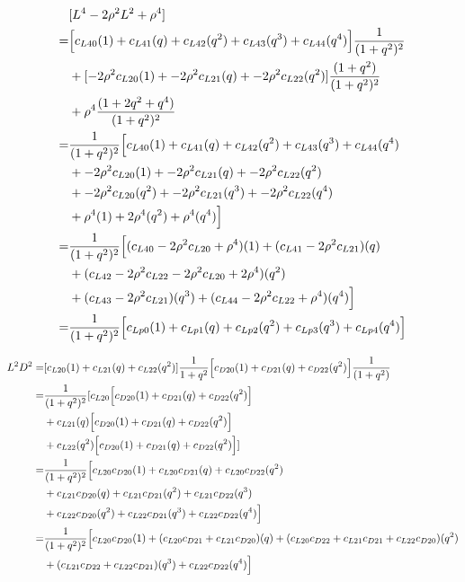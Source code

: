 \documentclass[12pt]{article}
\begin{document}
\begin{align}
    &[ L^4 -2\rho^2L^2 + \rho^4 ] \nonumber\\
    =& \Bigl[ c_{L40}(1) +  c_{L41}(q) + c_{L42}(q^2) + c_{L43}(q^3) + c_{L44}(q^4) \Bigr]\frac{1}{(1+q^2)^2} \nonumber\\
    &+ [ -2\rho^2c_{L20}(1) + -2\rho^2c_{L21}(q)  + -2\rho^2c_{L22}(q^2)]\frac{(1+q^2)}{(1+q^2)^2}\nonumber\\
    &+ \rho^4\frac{(1+2q^2+q^4)}{(1+q^2)^2}\\
    =& \frac{1}{(1+q^2)^2}\Bigl[ c_{L40}(1) +  c_{L41}(q) + c_{L42}(q^2) + c_{L43}(q^3) + c_{L44}(q^4)  \nonumber\\
    &+ -2\rho^2c_{L20}(1) + -2\rho^2c_{L21}(q)  + -2\rho^2c_{L22}(q^2)   \nonumber\\
    &+ -2\rho^2c_{L20}(q^2) + -2\rho^2c_{L21}(q^3)  + -2\rho^2c_{L22}(q^4)\nonumber\\
    &+ \rho^4(1) +2\rho^4(q^2) +\rho^4(q^4) \Bigr] \\
    =& \frac{1}{(1+q^2)^2}\Bigl[ (c_{L40} -2\rho^2c_{L20} + \rho^4)(1) +  (c_{L41} -2\rho^2c_{L21})(q) \nonumber\\
    &+ (c_{L42} -2\rho^2c_{L22} -2\rho^2c_{L20}+ 2\rho^4)(q^2) \nonumber\\
    &+ (c_{L43} -2\rho^2c_{L21})(q^3) + (c_{L44} -2\rho^2c_{L22} + \rho^4)(q^4)  \Bigr] \\
    =& \frac{1}{(1+q^2)^2}\Bigl[ c_{Lp0}(1) +  c_{Lp1}(q) + c_{Lp2}(q^2) + c_{Lp3}(q^3) + c_{Lp4}(q^4)  \Bigr]
\end{align}

\begin{align}
    L^2D^2 =& [ c_{L20}(1) + c_{L21}(q)  + c_{L22}(q^2)]\frac{1}{1+q^2}\Bigl[ c_{D20}(1) + c_{D21}(q) + c_{D22}(q^2)\Bigr]\frac{1}{(1+q^2)}\\
    =& \frac{1}{(1+q^2)^2}[   c_{L20}\Bigl[ c_{D20}(1) + c_{D21}(q) + c_{D22}(q^2)\Bigr] \nonumber\\
    &+ c_{L21}(q)\Bigl[ c_{D20}(1) + c_{D21}(q) + c_{D22}(q^2)\Bigr] \nonumber\\
    &+ c_{L22}(q^2)\Bigl[ c_{D20}(1) + c_{D21}(q) + c_{D22}(q^2)\Bigr] ] \\
    =& \frac{1}{(1+q^2)^2} \Bigl[    c_{L20}c_{D20}(1) + c_{L20}c_{D21}(q) +c_{L20} c_{D22}(q^2) \nonumber\\
    &+  c_{L21}c_{D20}(q) + c_{L21}c_{D21}(q^2) + c_{L21}c_{D22}(q^3) \nonumber\\
    &+  c_{L22}c_{D20}(q^2) + c_{L22}c_{D21}(q^3) + c_{L22}c_{D22}(q^4) \Bigr]\\
    =& \frac{1}{(1+q^2)^2} \Bigl[    c_{L20}c_{D20}(1) + (c_{L20}c_{D21} + c_{L21}c_{D20})(q) + (c_{L20}c_{D22} + c_{L21}c_{D21} + c_{L22}c_{D20})(q^2) \nonumber\\
    &+ (c_{L21}c_{D22} + c_{L22}c_{D21})(q^3) +  c_{L22}c_{D22}(q^4) \Bigr]
\end{align}
\end{document}
